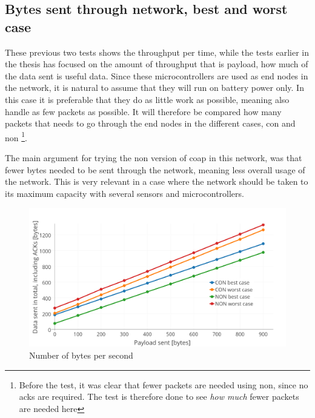 
\newpage
\subsection{Bytes sent through network, best and worst case}

\noindent These previous two tests shows the throughput per time, while the tests earlier in the thesis has focused on the amount of throughput that is \gls{payload}, how much of the data sent is useful data. Since these \glspl{microcontroller} are used as end nodes in the network, it is natural to assume that they will run on battery power only. In this case it is preferable that they do as little work as possible, meaning also handle as few packets as possible. It will therefore be compared how many packets that needs to go through the end nodes in the different cases, \gls{con} and \gls{non} \footnote{Before the test, it was clear that fewer packets are needed using \gls{non}, since no \glspl{ack} are required. The test is therefore done to see \textit{how much} fewer packets are needed here}.

\noindent The main argument for trying the \gls{non} version of \gls{coap} in this network, was that fewer bytes needed to be sent through the network, meaning less overall usage of the network. This is very relevant in a case where the network should be taken to its maximum capacity with several sensors and \glspl{microcontroller}. 

\begin{figure}[ht]
    \centering
    \includegraphics[width=1.0\textwidth]{bestCaseworstCase3.png}    
    \caption{Number of bytes per second}
    \label{fig:bestCaseworstCase}
\end{figure}


